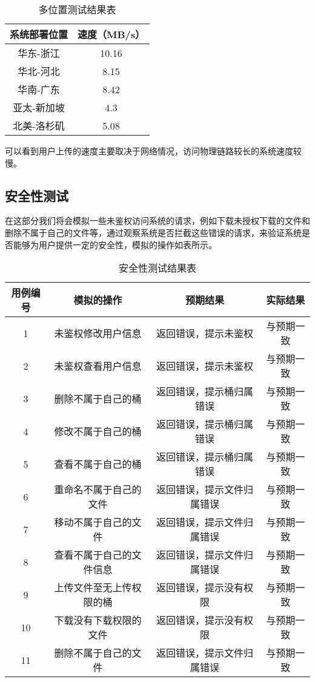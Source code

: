 \begin{table}[h]
    \centering
    \caption{多位置测试结果表}
    \begin{tabular}{cc}
      \toprule
      系统部署位置   & 速度（MB/s）   \\
      \midrule
      华东-浙江     & 10.16  \\
      华北-河北     & 8.15   \\
      华南-广东     & 8.42  \\
      亚太-新加坡   & 4.3   \\
      北美-洛杉矶   & 5.08  \\
      \bottomrule
    \end{tabular}
\end{table}

可以看到用户上传的速度主要取决于网络情况，访问物理链路较长的系统速度较慢。

\subsection{安全性测试}%

在这部分我们将会模拟一些未鉴权访问系统的请求，例如下载未授权下载的文件和删除不属于自己的文件等，通过观察系统是否拦截这些错误的请求，来验证系统是否能够为用户提供一定的安全性，模拟的操作如表所示。

\begin{table}[h]
  \centering
  \caption{安全性测试结果表}
  \begin{tabular}{cccc}
    \toprule
    用例编号 & 模拟的操作   & 预期结果 & 实际结果  \\
    \midrule
    1  & 未鉴权修改用户信息       & 返回错误，提示未鉴权       & 与预期一致\\
    2  & 未鉴权查看用户信息       & 返回错误，提示未鉴权       & 与预期一致\\
    3  & 删除不属于自己的桶       & 返回错误，提示桶归属错误    & 与预期一致 \\
    4  & 修改不属于自己的桶       & 返回错误，提示桶归属错误    & 与预期一致\\
    5  & 查看不属于自己的桶       & 返回错误，提示桶归属错误    & 与预期一致 \\
    6  & 重命名不属于自己的文件    & 返回错误，提示文件归属错误  & 与预期一致\\
    7  & 移动不属于自己的文件      & 返回错误，提示文件归属错误  & 与预期一致\\
    8  & 查看不属于自己的文件信息   & 返回错误，提示文件归属错误  & 与预期一致   \\
    9  & 上传文件至无上传权限的桶   & 返回错误，提示没有权限      & 与预期一致\\
    10 & 下载没有下载权限的文件     & 返回错误，提示没有权限      & 与预期一致\\
    11 & 删除不属于自己的文件       & 返回错误，提示文件归属错误   & 与预期一致 \\
    \bottomrule
  \end{tabular}
\end{table}

